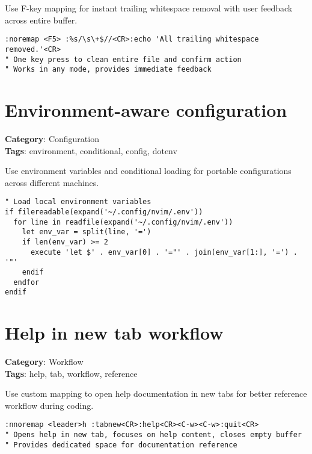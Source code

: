 {{{{Use F-key mapping for instant trailing whitespace removal with user feedback across entire buffer.

\begin{Exa*}{}
\begin{Verbatim}[fontsize=\footnotesize, breaklines, breakanywhere]
:noremap <F5> :%s/\s\+$//<CR>:echo 'All trailing whitespace removed.'<CR>
" One key press to clean entire file and confirm action
" Works in any mode, provides immediate feedback
\end{Verbatim}
\end{Exa*}

\section{Environment-aware configuration}

\textbf{Category}: Configuration\\ \textbf{Tags}: environment, conditional, config, dotenv
\vspace{0.5cm}

Use environment variables and conditional loading for portable configurations across different machines.

\begin{Exa*}{}
\begin{Verbatim}[fontsize=\footnotesize, breaklines, breakanywhere]
" Load local environment variables
if filereadable(expand('~/.config/nvim/.env'))
  for line in readfile(expand('~/.config/nvim/.env'))
    let env_var = split(line, '=')
    if len(env_var) >= 2
      execute 'let $' . env_var[0] . '="' . join(env_var[1:], '=') . '"'
    endif
  endfor
endif
\end{Verbatim}
\end{Exa*}

\section{Help in new tab workflow}

\textbf{Category}: Workflow\\ \textbf{Tags}: help, tab, workflow, reference
\vspace{0.5cm}

Use custom mapping to open help documentation in new tabs for better reference workflow during coding.

\begin{Exa*}{}
\begin{Verbatim}[fontsize=\footnotesize, breaklines, breakanywhere]
:nnoremap <leader>h :tabnew<CR>:help<CR><C-w><C-w>:quit<CR>
" Opens help in new tab, focuses on help content, closes empty buffer
" Provides dedicated space for documentation reference
\end{Verbatim}
\end{Exa*}

}}}}
